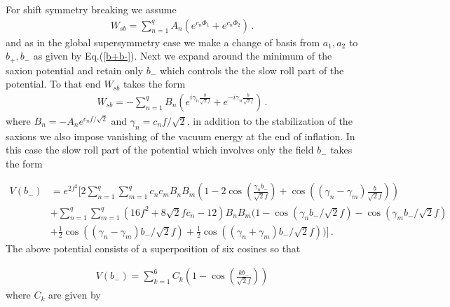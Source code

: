 \documentclass[12pt]{article}
\begin{document}
For shift symmetry breaking  we assume 
\begin{align}
W_{sb} = \sum_{n=1}^q A_n \left ( e^{c_n\Phi_1} + e^{c_n\Phi_2}\right)\,.
\end{align}
and as in the global supersymmetry case we make a change of basis from $a_1, a_2$ to $b_+, b_-$ as given by
Eq.(\ref{b+b-}). 
 Next we  expand around the minimum of the saxion potential and  retain only $b_-$ which controls the 
 the slow roll part of the potential. To that end 
  $W_{sb}$ takes the form 
\begin{align}
W_{sb}= -\sum_{n=1}^q B_n (e^{i\gamma_n\frac{b}{\sqrt 2 f}} + e^{-i\gamma_n \frac{b}{\sqrt 2f}})\,.
\end{align}
where $B_n= - A_n e^{c_n f/\sqrt 2}$ and $\gamma_n = c_n f/\sqrt 2$.
in addition to the stabilization of the saxions we also  impose vanishing of the vacuum energy 
at the end of inflation. In this case the slow roll part of the potential which involves only the field $b_-$ takes the form

\begin{align}
V(b_-)&= 
 e^{2f^2}\Big[ 
2\sum_{n=1}^q\sum_{m=1}^q  c_nc_mB_nB_m \left(1- 2 \cos(\frac{\gamma_n b_-}{\sqrt 2 f}) + \cos((\gamma_n-\gamma_m) \frac{b}{\sqrt 2 f})\right)\nonumber\\
&+ \sum_{n=1}^q\sum_{m=1}^q 
(16 f^2  + 8 \sqrt 2 f c_n -12)B_nB_m
\Big(1-  \cos(\gamma_n b_-/ \sqrt 2f)-  \cos(\gamma_m b_-/ \sqrt 2f) \nonumber\\
&+\frac{1}{2} \cos((\gamma_n-\gamma_m) b_-/ \sqrt 2f)+ \frac{1}{2}  \cos((\gamma_n+\gamma_m) b_-/ \sqrt 2f)
\Big)
\Big]\,.
\label{sugrapot}
\end{align}
The above potential consists of a superposition of six cosines so that 

\begin{align}
V(b_-)= \sum_{k=1}^{6} C_k \left(1-\cos(\frac{kb_-}{\sqrt 2 f})\right)
\end{align}
where $C_k$ are given by 
\end{document}

